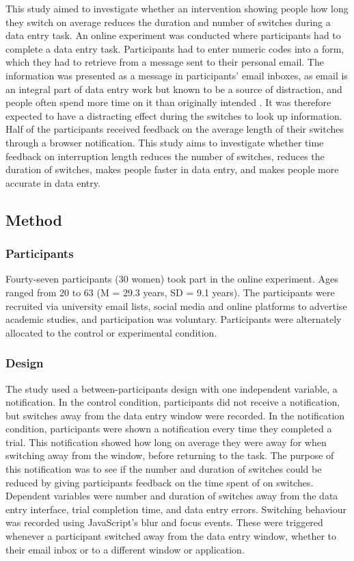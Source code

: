 This study aimed to investigate whether an intervention showing people how long they switch on average reduces the duration and number of switches during a data entry task. An online experiment was conducted where participants had to complete a data entry task. Participants had to enter numeric codes into a form, which they had to retrieve from a message sent to their personal email. The information was presented as a message in participants' email inboxes, as email is an integral part of data entry work but known to be a source of distraction, and people often spend more time on it than originally intended \citep{Hanrahan2015, Mark2016}. It was therefore expected to have a distracting effect during the switches to look up information. Half of the participants received feedback on the average length of their switches through a browser notification. 
This study aims to investigate whether time feedback on interruption length reduces the number of switches, reduces the duration of switches, makes people faster in data entry, and makes people more accurate in data entry.

\subsection{Method}
\subsubsection{Participants}
Fourty-seven participants (30 women) took part in the online experiment. Ages ranged from 20 to 63 (M = 29.3 years, SD = 9.1 years). The participants were recruited via university email lists, social media and online platforms to advertise academic studies, and participation was voluntary. Participants were alternately allocated to the control or experimental condition.

\subsubsection{Design}
The study used a between-participants design with one independent variable, a notification. In the control condition, participants did not receive a notification, but switches away from the data entry window were recorded. In the notification condition, participants were shown a notification every time they completed a trial. This notification showed how long on average they were away for when switching away from the window, before returning to the task. The purpose of this notification was to see if the number and duration of switches could be reduced by giving participants feedback on the time spent of on switches. Dependent variables were number and duration of switches away from the data entry interface, trial completion time, and data entry errors. Switching behaviour was recorded using JavaScript's blur and focus events. These were triggered whenever a participant switched away from the data entry window, whether to their email inbox or to a different window or application. 

